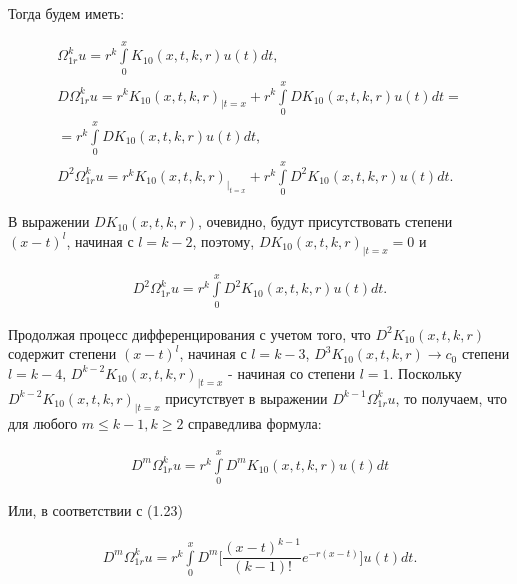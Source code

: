 Тогда будем иметь:

\begin{equation}
\begin{array}{c}
\nonumber

\Omega_{1r}^ku = r^k \int\limits_0^x K_{10}(x,t,k,r)u(t)dt, \\
D\Omega_{1r}^ku = r^kK_{10}(x,t,k,r)_{|t=x} + r^k\int\limits_0^x DK_{10}(x,t,k,r)u(t)dt = \\
= r^k\int\limits_0^x DK_{10}(x,t,k,r)u(t)dt, \\
D^2\Omega_{1r}^ku = r^kK_{10}(x,t,k,r)_{|_{t=x}} + r^k\int\limits_0^x D^2K_{10}(x,t,k,r)u(t)dt.

\end{array}
\end{equation}

В выражении $ DK_{10}(x,t,k,r) $, очевидно, будут присутствовать степени $ (x-t)^l $, начиная с $ l = k - 2 $, поэтому, $ DK_{10}(x,t,k,r)_{|t=x} = 0 $ и

\begin{equation}
\begin{array}{c}
\nonumber

D^2\Omega_{1r}^ku = r^k\int\limits_0^x D^2K_{10}(x,t,k,r)u(t)dt.

\end{array}
\end{equation}


Продолжая процесс дифференцирования с учетом того, что $ D^2K_{10}(x,t,k,r) $ содержит степени $ (x-t)^l $, начиная с $ l = k - 3 $, $ D^3K_{10}(x,t,k,r) \rightarrow c_0 $  степени $ l = k - 4 $, $ D^{k-2}K_{10}(x,t,k,r)_{|t=x} $ - начиная со степени $ l = 1 $. Поскольку $ D^{k-2}K_{10}(x,t,k,r)_{|t=x} $ присутствует в выражении $ D^{k-1}\Omega_{1r}^ku $, то получаем, что для любого $ m \leq k - 1, k \geq 2 $ справедлива формула:

\begin{equation}
\begin{array}{c}
\nonumber

D^m\Omega_{1r}^ku = r^k\int\limits_0^x D^mK_{10}(x,t,k,r)u(t)dt

\end{array}
\end{equation}

Или, в соответствии с (1.23)

\begin{equation}
\begin{array}{c}

D^m\Omega_{1r}^ku = r^k\int\limits_0^x D^m\biggl[\dfrac{(x-t)^{k-1}}{(k-1)!}e^{-r(x-t)}\biggr]u(t)dt.

\end{array}
\end{equation}

